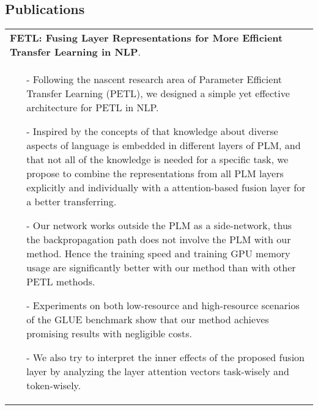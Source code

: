 \documentclass[a4paper,12pt]{article}
\newcommand{\signed}[1]{%
\unskip\nobreak\hfil\penalty50
   \hskip2em\hbox{}\nobreak\hfil#1
   \parfillskip=0pt \finalhyphendemerits=0 }
\begin{document}
\begin{CJK*}{UTF8}{gbsn}
\section{Publications}

\begin{tabularx}{\linewidth}{ @{}X@{} }
\textbf{FETL: Fusing Layer Representations for More Efficient Transfer Learning in NLP}. \signed{\textit{zhuwenq}. under review.}\\[3.75pt]
\begin{minipage}[t]{\linewidth}
    \begin{itemize}[nosep,after=\strut, leftmargin=1em, itemsep=3pt]
        \item[-] Following the nascent research area of Parameter Efficient Transfer Learning (PETL),
        we designed a simple yet effective architecture for PETL in NLP.
        \item[-] Inspired by the concepts of that knowledge about diverse aspects of language is embedded
        in different layers of PLM, and that not all of the knowledge is needed for a specific task,
        we propose to combine the representations from all PLM layers explicitly and individually
        with a attention-based fusion layer for a better transferring.
        \item[-] Our network works outside the PLM as a side-network, thus the backpropagation
        path does not involve the PLM with our method. Hence the training speed and training GPU
        memory usage are significantly better with our method than with other PETL methods.
        \item[-] Experiments on both low-resource and high-resource scenarios of the GLUE benchmark
        show that our method achieves promising results with negligible costs.
        \item[-] We also try to interpret the inner effects of the proposed fusion layer by analyzing
        the layer attention vectors task-wisely and token-wisely.
    \end{itemize}
    \end{minipage}
\end{tabularx}



\end{CJK*}
\end{document}
